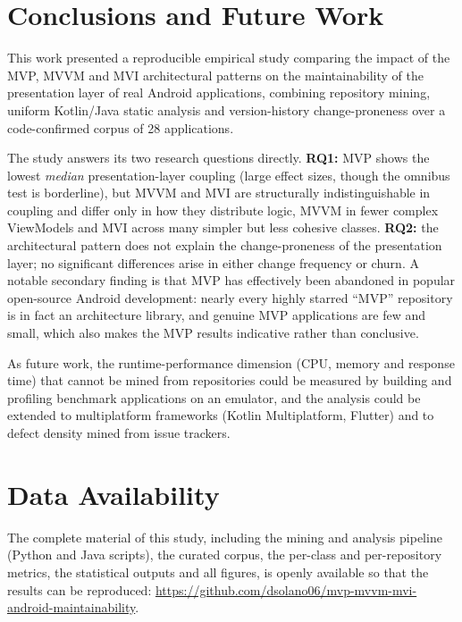 \documentclass[conference]{IEEEtran}
\begin{document}
\section{Conclusions and Future Work} \label{sec:Conclusions}

This work presented a reproducible empirical study comparing the impact of the
MVP, MVVM and MVI architectural patterns on the maintainability of the
presentation layer of real Android applications, combining repository mining,
uniform Kotlin/Java static analysis and version-history change-proneness over a
code-confirmed corpus of 28 applications.

The study answers its two research questions directly. \textbf{RQ1:} MVP shows
the lowest \emph{median} presentation-layer coupling (large effect sizes, though
the omnibus test is borderline), but MVVM and MVI are
structurally indistinguishable in coupling and differ only in how they distribute
logic, MVVM in fewer complex ViewModels and MVI across many simpler but less
cohesive classes. \textbf{RQ2:} the architectural pattern does not explain the
change-proneness of the presentation layer; no significant differences arise in
either change frequency or churn. A notable secondary finding is that MVP has
effectively been abandoned in popular open-source Android development: nearly
every highly starred ``MVP'' repository is in fact an architecture library, and
genuine MVP applications are few and small, which also makes the MVP results
indicative rather than conclusive.

As future work, the runtime-performance dimension (CPU, memory and response time)
that cannot be mined from repositories could be measured by building and profiling
benchmark applications on an emulator, and the analysis could be extended to
multiplatform frameworks (Kotlin Multiplatform, Flutter) and to defect density
mined from issue trackers.

\section*{Data Availability}
The complete material of this study, including the mining and analysis pipeline
(Python and Java scripts), the curated corpus, the per-class and per-repository
metrics, the statistical outputs and all figures, is openly available so that the
results can be reproduced:
\url{https://github.com/dsolano06/mvp-mvvm-mvi-android-maintainability}.
\end{document}
